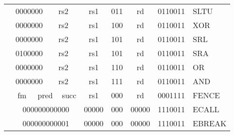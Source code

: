 \begin{table}[p]
\begin{small}
\begin{center}
\begin{tabular}{p{0in}p{0.4in}p{0.05in}p{0.05in}p{0.05in}p{0.05in}p{0.4in}p{0.6in}p{0.4in}p{0.6in}p{0.7in}l}
&
\multicolumn{4}{|c|}{0000000} &
\multicolumn{2}{c|}{rs2} &
\multicolumn{1}{c|}{rs1} &
\multicolumn{1}{c|}{011} &
\multicolumn{1}{c|}{rd} &
\multicolumn{1}{c|}{0110011} & SLTU \\
\cline{2-11}
  

&
\multicolumn{4}{|c|}{0000000} &
\multicolumn{2}{c|}{rs2} &
\multicolumn{1}{c|}{rs1} &
\multicolumn{1}{c|}{100} &
\multicolumn{1}{c|}{rd} &
\multicolumn{1}{c|}{0110011} & XOR \\
\cline{2-11}
  

&
\multicolumn{4}{|c|}{0000000} &
\multicolumn{2}{c|}{rs2} &
\multicolumn{1}{c|}{rs1} &
\multicolumn{1}{c|}{101} &
\multicolumn{1}{c|}{rd} &
\multicolumn{1}{c|}{0110011} & SRL \\
\cline{2-11}
  

&
\multicolumn{4}{|c|}{0100000} &
\multicolumn{2}{c|}{rs2} &
\multicolumn{1}{c|}{rs1} &
\multicolumn{1}{c|}{101} &
\multicolumn{1}{c|}{rd} &
\multicolumn{1}{c|}{0110011} & SRA \\
\cline{2-11}
  

&
\multicolumn{4}{|c|}{0000000} &
\multicolumn{2}{c|}{rs2} &
\multicolumn{1}{c|}{rs1} &
\multicolumn{1}{c|}{110} &
\multicolumn{1}{c|}{rd} &
\multicolumn{1}{c|}{0110011} & OR \\
\cline{2-11}
  

&
\multicolumn{4}{|c|}{0000000} &
\multicolumn{2}{c|}{rs2} &
\multicolumn{1}{c|}{rs1} &
\multicolumn{1}{c|}{111} &
\multicolumn{1}{c|}{rd} &
\multicolumn{1}{c|}{0110011} & AND \\
\cline{2-11}
  

&
\multicolumn{2}{|c|}{fm} &
\multicolumn{3}{c|}{pred} &
\multicolumn{1}{c|}{succ} &
\multicolumn{1}{c|}{rs1} &
\multicolumn{1}{c|}{000} &
\multicolumn{1}{c|}{rd} &
\multicolumn{1}{c|}{0001111} & FENCE \\
\cline{2-11}
  

&
\multicolumn{6}{|c|}{000000000000} &
\multicolumn{1}{c|}{00000} &
\multicolumn{1}{c|}{000} &
\multicolumn{1}{c|}{00000} &
\multicolumn{1}{c|}{1110011} & ECALL \\
\cline{2-11}
  

&
\multicolumn{6}{|c|}{000000000001} &
\multicolumn{1}{c|}{00000} &
\multicolumn{1}{c|}{000} &
\multicolumn{1}{c|}{00000} &
\multicolumn{1}{c|}{1110011} & EBREAK \\
\cline{2-11}
  

\end{tabular}
\end{center}
\end{small}

\end{table}
  

